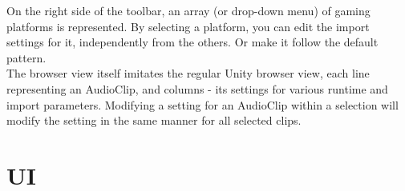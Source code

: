 \documentclass[a4paper,10pt]{article}
\begin{document}
On the right side of the toolbar, an array (or drop-down menu) of gaming platforms is represented. By selecting a platform, you can edit the import settings for it, independently from the others. Or make it follow the default pattern. \\

The browser view itself imitates the regular Unity browser view, each line representing an AudioClip, and columns - its settings for various runtime and import parameters. Modifying a setting for an AudioClip within a selection will modify the setting in the same manner for all selected clips. 
%
%
%
%
%
%
%
%


\section{UI}
\end{document}
